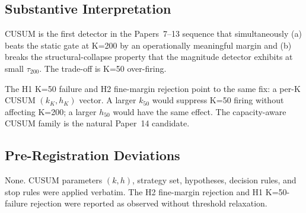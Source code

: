 \subsection{Substantive Interpretation}

CUSUM is the first detector in the Papers~7--13 sequence that
simultaneously (a) beats the static gate at K=200 by an operationally
meaningful margin and (b) breaks the structural-collapse property
that the magnitude detector exhibits at small $\tau_{200}$. The
trade-off is K=50 over-firing.

The H1 K=50 failure and H2 fine-margin rejection point to the same
fix: a per-K CUSUM $(k_K, h_K)$ vector. A larger $k_{50}$ would
suppress K=50 firing without affecting K=200; a larger $h_{50}$
would have the same effect. The capacity-aware CUSUM family is the
natural Paper~14 candidate.

\subsection{Pre-Registration Deviations}

None. CUSUM parameters $(k, h)$, strategy set, hypotheses, decision
rules, and stop rules were applied verbatim. The H2 fine-margin
rejection and H1 K=50-failure rejection were reported as observed
without threshold relaxation.

